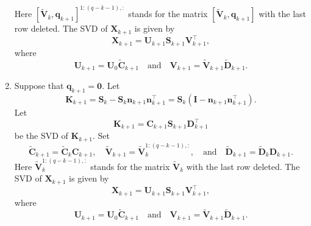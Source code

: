 \documentclass[11pt,a4paper]{article}
\DeclareMathOperator*{\diag}{diag}
\newcommand{\0}{\M{0}}
\newcommand{\M}[1]{\mathbf{#1}}
\newcommand{\Mt}[1]{\tilde{\M{#1}}}
\newcommand{\T}{\top}
\newcommand{\ve}[1]{\mathbf{#1}}
\begin{document}
\begin{enumerate}[font=\upshape,label=(\roman*),wide,align=right]
Here $[\Mt{V}_k, \ve{q}_{k+1}]^{1:(q - k - 1),:}$ stands for the matrix $[\Mt{V}_k, \ve{q}_{k+1}]$ with the last row deleted.  The SVD of $\M{X}_{k+1}$ is given by
\begin{displaymath}
  \M{X}_{k+1} = \M{U}_{k+1} \M{S}_{k+1}\M{V}_{k+1}^\T,
\end{displaymath}
where
\begin{displaymath}
  \M{U}_{k+1} = \M{U}_0 \Mt{C}_{k+1}
  \quad
  \text{and}
  \quad
  \M{V}_{k+1} = \Mt{V}_{k+1} \Mt{D}_{k+1}.
\end{displaymath}
\item Suppose that $\ve{q}_{k+1} =\0$. Let
\begin{displaymath}
  \M{K}_{k+1}
  = \M{S}_k - \M{S}_k \ve{n}_{k+1} \ve{n}_{k+1}^\T
  = \M{S}_k \left( \M{I} - \ve{n}_{k+1} \ve{n}_{k+1}^\T \right).
\end{displaymath}
Let
\begin{displaymath}
  \M{K}_{k+1} = \M{C}_{k+1} \M{S}_{k+1}  \M{D}_{k+1}^\T
\end{displaymath}
be the SVD of $\M{K}_{k+1}$.  
Set
\begin{displaymath}
  \Mt{C}_{k+1} = \Mt{C}_k \M{C}_{k+1},
  \quad
  \Mt{V}_{k+1}
  =
  \Mt{V}_k^{1:(q-k-1),:},
  \quad
  \text{and}
  \quad
  \Mt{D}_{k+1}
  = \Mt{D}_k \M{D}_{k+1}.
\end{displaymath}
Here $\Mt{V}_k^{1:(q - k - 1),:}$ stands for the matrix $\Mt{V}_k$ with the last row deleted.  The SVD of $\M{X}_{k+1}$ is given by
\begin{displaymath}
  \M{X}_{k+1} = \M{U}_{k+1} \M{S}_{k+1}\M{V}_{k+1}^\T,
\end{displaymath}
where
\begin{displaymath}
  \M{U}_{k+1} = \M{U}_0 \Mt{C}_{k+1}
  \quad
  \text{and}
  \quad
  \M{V}_{k+1} = \Mt{V}_{k+1} \Mt{D}_{k+1}.
\end{displaymath}

\end{enumerate}

\end{document}
